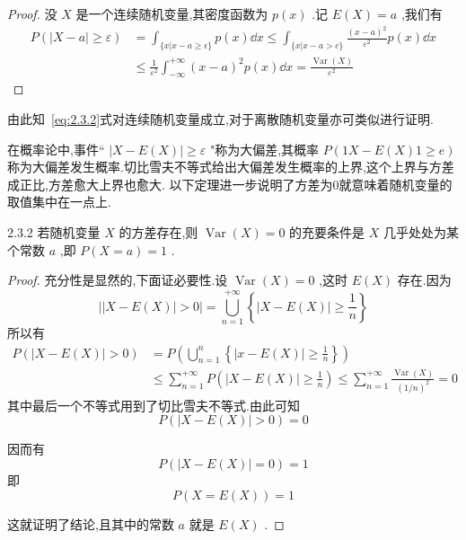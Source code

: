 \begin{proof}
	没 $ X $ 是一个连续随机变量,其密度函数为 $ p(x) $ .记 $ E(X)=a $ ,我们有
	\[
	\begin{array}{ll}
	{P(|X-a| \geqslant \varepsilon)} & {=\int_{\{x | x-a \geq \epsilon\}} p(x) \dd x \leq \int_{\{x | x-a>c\}} \frac{(x-a)^{2}}{\varepsilon^{2}} p(x) \dd x} \\ 
	{} & {\leqslant \frac{1}{\varepsilon^{2}} \int_{-\infty}^{+\infty}(x-a)^{2} p(x) \dd x=\frac{\operatorname{Var}(X)}{\varepsilon^{2}}}
	\end{array}
	\] 
\end{proof}

由此知~\ref{eq:2.3.2}式对连续随机变量成立,对于离散随机变量亦可类似进行证明.

在概率论中,事件`` $ |X-E(X)| \geqslant \varepsilon $ "称为大偏差,其概率 $ P(1X-E(X)1 \geqslant e) $ 称为大偏差发生概率.切比雪夫不等式给出大偏差发生概率的上界,这个上界与方差成正比,方差愈大上界也愈大.
以下定理进一步说明了方差为0就意味着随机变量的取值集中在一点上.

\begin{theorem}{}{2.3.2}
	若随机变量 $ X $ 的方差存在,则 $ \operatorname{Var}(X)=0 $ 的充要条件是 $ X $ 几乎处处为某个常数 $ a $ ,即 $ P(X=a)=1 $ .
\end{theorem}

\begin{proof}
	充分性是显然的,下面证必要性.设 $ \operatorname{Var}(X)=0 $ ,这时 $ E(X) $ 存在.因为
	\[
	| | X-E(X)|>0|=\bigcup_{n=1}^{+\infty}\left\{|X-E(X)| \geqslant \frac{1}{n}\right\}
	\]
	所以有
	\[
	\begin{aligned} P(|X-E(X)|>0) &=P\left(\bigcup_{n=1}^{n}\left\{|x-E(X)| \geqslant \frac{1}{n}\right\}\right) \\ & \leqslant \sum_{n=1}^{+\infty} P\left(|X-E(X)| \geqslant \frac{1}{n}\right) \leqslant \sum_{n=1}^{+\infty} \frac{\operatorname{Var}(X)}{(1 / n)^{2}}=0 \end{aligned}
	\]
	其中最后一个不等式用到了切比雪夫不等式.由此可知
	\[
	P(|X-E(X)|>0)=0
	\]
	
	因而有
	\[
	P(|X-E(X)|=0)=1
	\]
	即
	\[
	P(X=E(X))=1
	\]
	
	这就证明了结论,且其中的常数 $ a $ 就是 $ E(X) $ .
\end{proof}


